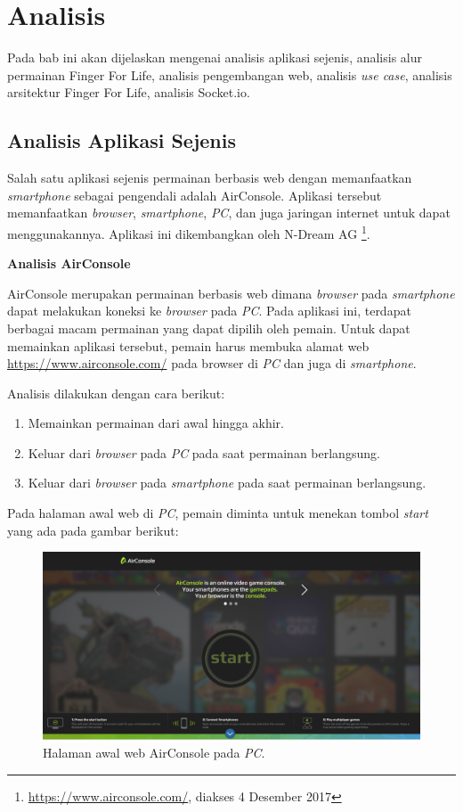\chapter{Analisis}
\label{chap:analisis}

Pada bab ini akan dijelaskan mengenai analisis aplikasi sejenis, analisis alur permainan Finger For Life, analisis pengembangan web, analisis \textit{use case}, analisis arsitektur Finger For Life, analisis Socket.io.

\section{Analisis Aplikasi Sejenis}
\label{sec:AirConsole}

Salah satu aplikasi sejenis permainan berbasis web dengan memanfaatkan \textit{smartphone} sebagai pengendali adalah AirConsole. Aplikasi tersebut memanfaatkan \textit{browser}, \textit{smartphone}, \textit{PC}, dan juga jaringan internet untuk dapat menggunakannya. Aplikasi ini dikembangkan oleh N-Dream AG \footnote{\url{https://www.airconsole.com/}, diakses 4 Desember 2017}.

\textbf{Analisis AirConsole} 

AirConsole merupakan permainan berbasis web dimana \textit{browser} pada \textit{smartphone} dapat melakukan koneksi ke \textit{browser} pada  \textit{PC}. Pada aplikasi ini, terdapat berbagai macam permainan yang dapat dipilih oleh pemain. Untuk dapat memainkan aplikasi tersebut, pemain harus membuka alamat web \url{https://www.airconsole.com/} pada browser di \textit{PC} dan juga di \textit{smartphone}.

Analisis dilakukan dengan cara berikut:
\begin{enumerate}
	\item Memainkan permainan dari awal hingga akhir.
	\item Keluar dari \textit{browser} pada \textit{PC} pada saat permainan berlangsung.
	\item Keluar dari \textit{browser} pada \textit{smartphone} pada saat permainan berlangsung.
\end{enumerate}
Pada halaman awal web di \textit{PC}, pemain diminta untuk menekan tombol \textit{start} yang ada pada gambar berikut: 

\begin{figure}[H]
	\centering
	\includegraphics[scale=0.2]{Gambar/con1_home1}
	\caption{Halaman awal web AirConsole pada \textit{PC}.}
	\label{fig:16_con1_home1}
\end{figure}

